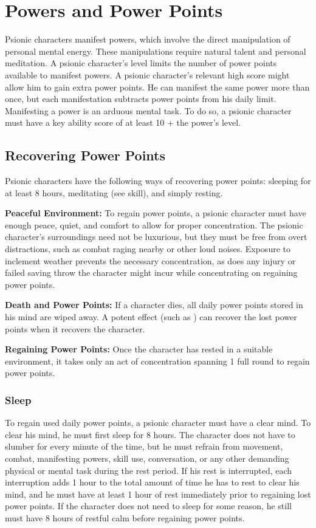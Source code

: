 \section{Powers and Power Points}
Psionic characters manifest powers, which involve the direct manipulation of personal mental energy. These manipulations require natural talent and personal meditation. A psionic character's level limits the number of power points available to manifest powers. A psionic character's relevant high score might allow him to gain extra power points. He can manifest the same power more than once, but each manifestation subtracts power points from his daily limit. Manifesting a power is an arduous mental task. To do so, a psionic character must have a key ability score of at least 10 + the power's level.

\subsection{Recovering Power Points}
Psionic characters have the following ways of recovering power points: sleeping for at least 8 hours, meditating (see  skill), and simply resting.

\textbf{Peaceful Environment:} To regain power points, a psionic character must have enough peace, quiet, and comfort to allow for proper concentration. The psionic character's surroundings need not be luxurious, but they must be free from overt distractions, such as combat raging nearby or other loud noises. Exposure to inclement weather prevents the necessary concentration, as does any injury or failed saving throw the character might incur while concentrating on regaining power points.

\textbf{Death and Power Points:} If a character dies, all daily power points stored in his mind are wiped away. A potent effect (such as ) can recover the lost power points when it recovers the character.

\textbf{Regaining Power Points:} Once the character has rested in a suitable environment, it takes only an act of concentration spanning 1 full round to regain power points.

\subsubsection{Sleep}
To regain used daily power points, a psionic character must have a clear mind. To clear his mind, he must first sleep for 8 hours. The character does not have to slumber for every minute of the time, but he must refrain from movement, combat, manifesting powers, skill use, conversation, or any other demanding physical or mental task during the rest period. If his rest is interrupted, each interruption adds 1 hour to the total amount of time he has to rest to clear his mind, and he must have at least 1 hour of rest immediately prior to regaining lost power points. If the character does not need to sleep for some reason, he still must have 8 hours of restful calm before regaining power points.

